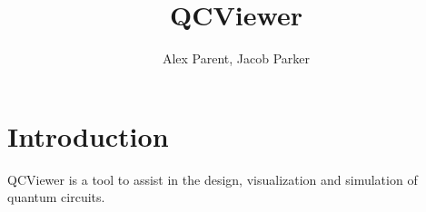 \documentclass{article}
\begin{document}
\title{QCViewer}
\author{Alex Parent, Jacob Parker}
\maketitle

\section{Introduction}
QCViewer is a tool to assist in the design, visualization and simulation of quantum circuits.

%
%
\end{document}
